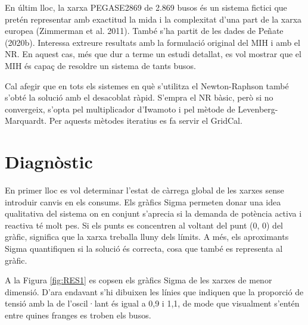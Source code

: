 En últim lloc, la xarxa PEGASE2869 de 2.869 busos és un sistema fictici que pretén representar amb exactitud la mida i la complexitat d'una part de la xarxa europea (Zimmerman et al. 2011). També s'ha partit de les dades de Peñate (2020b). Interessa extreure resultats amb la formulació original del MIH i amb el NR. En aquest cas, més que dur a terme un estudi detallat, es vol mostrar que el MIH és capaç de resoldre un sistema de tants busos.

Cal afegir que en tots els sistemes en què s'utilitza el Newton-Raphson també s'obté la solució amb el desacoblat ràpid. S'empra el NR bàsic, però si no convergeix, s'opta pel multiplicador d'Iwamoto i pel mètode de Levenberg-Marquardt. Per aquests mètodes iteratius es fa servir el GridCal.

\section{Diagnòstic} %
En primer lloc es vol determinar l'estat de càrrega global de les xarxes sense introduir canvis en els consums. Els gràfics Sigma permeten donar una idea qualitativa del sistema on en conjunt s'aprecia si la demanda de potència activa i reactiva té molt pes. Si els punts es concentren al voltant del punt (0, 0) del gràfic, significa que la xarxa treballa lluny dels límits. A més, els aproximants Sigma quantifiquen si la solució és correcta, cosa que també es representa al gràfic. 

A la Figura \ref{fig:RES1} es copsen els gràfics Sigma de les xarxes de menor dimensió. D'ara endavant s'hi dibuixen les línies que indiquen que la proporció de tensió amb la de l'oscil·lant és igual a 0,9 i 1,1, de mode que visualment s'entén entre quines franges es troben els busos. 

